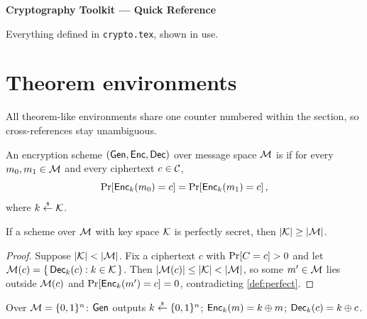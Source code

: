 \documentclass[11pt,a4paper]{article}
\begin{document}
\thispagestyle{fancy}

\begin{center}
    {\Large\bfseries Cryptography Toolkit --- Quick Reference\par}
    \vspace{0.2cm}
    {\small Everything defined in \texttt{crypto.tex}, shown in use.\par}
\end{center}

\vspace{0.4cm}

\section{Theorem environments}

All theorem-like environments share one counter numbered within the section,
so cross-references stay unambiguous.

\begin{definition}\label{def:perfect}
    An encryption scheme $(\mathsf{Gen},\mathsf{Enc},\mathsf{Dec})$ over message space $\mathcal{M}$ is
     if for every $m_0,m_1 \in \mathcal{M}$ and every
    ciphertext $c \in \mathcal{C}$,
    \begin{equation}
        \Pr\!\left[ \mathsf{Enc}_k(m_0) = c \right] = \Pr\!\left[ \mathsf{Enc}_k(m_1) = c \right],
        \label{eq:perfect}
    \end{equation}
    where $k \stackrel{\scriptscriptstyle\$}{\leftarrow} \mathcal{K}$.
\end{definition}

\begin{theorem}[Shannon]\label{thm:shannon}
    If a scheme over $\mathcal{M}$ with key space $\mathcal{K}$ is perfectly
    secret, then $\left\lvert \mathcal{K} \right\rvert \geq \left\lvert \mathcal{M} \right\rvert$.
\end{theorem}

\begin{proof}
    Suppose $\left\lvert \mathcal{K} \right\rvert < \left\lvert \mathcal{M} \right\rvert$. Fix a ciphertext $c$ with
    $\Pr\!\left[ C = c \right] > 0$ and let
    $\mathcal{M}(c) = \{\, \mathsf{Dec}_k(c) : k \in \mathcal{K} \,\}$. Then
    $\left\lvert \mathcal{M}(c) \right\rvert \leq \left\lvert \mathcal{K} \right\rvert < \left\lvert \mathcal{M} \right\rvert$, so some
    $m' \in \mathcal{M}$ lies outside $\mathcal{M}(c)$ and
    $\Pr\!\left[ \mathsf{Enc}_k(m') = c \right] = 0$, contradicting \cref{def:perfect}.
\end{proof}

\begin{construction}\label{con:otp}
    Over $\mathcal{M} = \{0,1\}^{n}$: $\mathsf{Gen}$ outputs $k \stackrel{\scriptscriptstyle\$}{\leftarrow} \{0,1\}^{n}$;
    $\mathsf{Enc}_k(m) = k \oplus m$; $\mathsf{Dec}_k(c) = k \oplus c$.
\end{construction}
\end{document}
